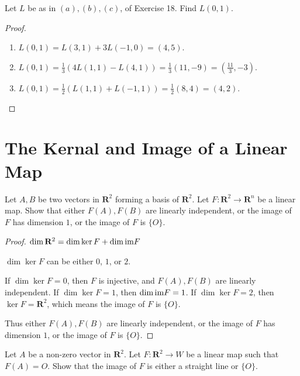 \begin{exercise}
    Let $L$ be as in $(a), (b), (c)$, of Exercise 18. Find $L(0, 1)$.
\end{exercise}

\begin{proof}
    \begin{enumerate}[label={(\alph*)}]
        \item $L(0, 1) = L(3, 1) + 3L(-1, 0) = (4, 5)$.
        \item $L(0, 1) = \frac{1}{3}(4L(1, 1) - L(4, 1)) = \frac{1}{3}(11, -9) = (\frac{11}{3}, -3)$.
        \item $L(0, 1) = \frac{1}{2}(L(1, 1) + L(-1, 1)) = \frac{1}{2}(8, 4) = (4, 2)$.
    \end{enumerate}
\end{proof}

\section{The Kernal and Image of a Linear Map}
\setcounter{exercise}{0}

\begin{exercise}
    Let $A, B$ be two vectors in $\mathbf{R}^{2}$ forming a basis of $\mathbf{R}^{2}$. Let $F: \mathbf{R}^{2} \to \mathbf{R}^{n}$ be a linear map. Show that either $F(A), F(B)$ are linearly independent, or the image of $F$ has dimension $1$, or the image of $F$ is $\{ O \}$.
\end{exercise}

\begin{proof}
    $\dim\mathbf{R}^{2} = \dim\ker F + \dim\text{im} F$

    $\dim\ker F$ can be either $0$, $1$, or $2$.

    If $\dim\ker F = 0$, then $F$ is injective, and $F(A), F(B)$ are linearly independent. If $\dim\ker F = 1$, then $\dim\text{im} F = 1$. If $\dim\ker F = 2$, then $\ker F = \mathbf{R}^{2}$, which means the image of $F$ is $\{ O \}$.

    Thus either $F(A), F(B)$ are linearly independent, or the image of $F$ has dimension $1$, or the image of $F$ is $\{ O \}$.
\end{proof}

\begin{exercise}
    Let $A$ be a non-zero vector in $\mathbf{R}^{2}$. Let $F: \mathbf{R}^{2} \to W$ be a linear map such that $F(A) = O$. Show that the image of $F$ is either a straight line or $\{ O \}$.
\end{exercise}

